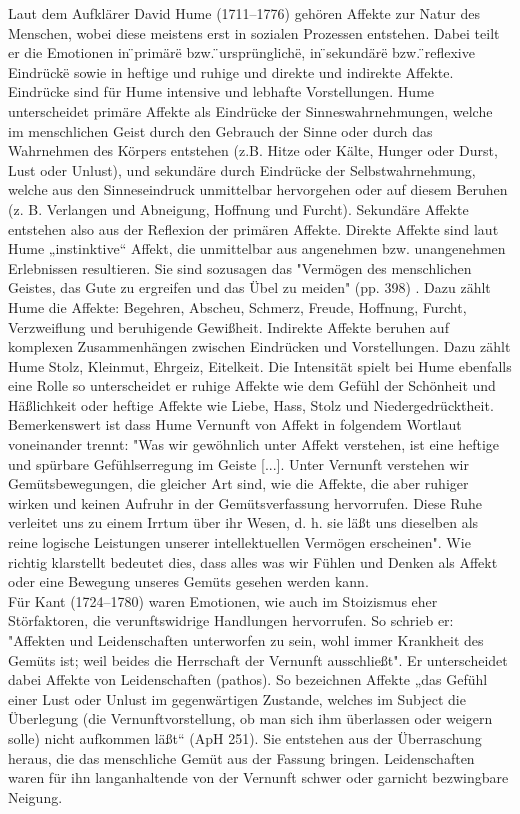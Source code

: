 Laut dem Aufklärer David Hume (1711–1776)  gehören Affekte zur Natur des Menschen, wobei diese meistens erst in sozialen Prozessen entstehen. Dabei teilt er die Emotionen in \"{}primäre\"{} bzw. \"{}ursprüngliche\"{}, in \"{}sekundäre\"{} bzw. \"{}reflexive Eindrücke\"{} sowie in heftige und ruhige und direkte und indirekte Affekte. Eindrücke sind für Hume intensive und lebhafte Vorstellungen. Hume unterscheidet primäre Affekte als Eindrücke der Sinneswahrnehmungen, welche im menschlichen Geist durch den Gebrauch der Sinne oder durch das Wahrnehmen des Körpers entstehen (z.B.  Hitze  oder  Kälte,  
Hunger  oder  Durst,  Lust  oder  Unlust), und sekundäre durch Eindrücke der Selbstwahrnehmung, welche aus den Sinneseindruck unmittelbar hervorgehen oder auf diesem Beruhen (z. B. Verlangen und Abneigung,  Hoffnung und Furcht). Sekundäre Affekte entstehen also aus der Reflexion der primären Affekte. Direkte Affekte sind laut Hume  „instinktive“ Affekt, die unmittelbar aus angenehmen bzw. unangenehmen Erlebnissen resultieren. Sie sind sozusagen das  "Vermögen  des  menschlichen  
Geistes,  das  Gute  zu  ergreifen  und  das  Übel  zu  meiden" (pp. 398) \cite{demmerling_hume:_2008}. Dazu zählt Hume die Affekte: Begehren,  Abscheu,  Schmerz,  Freude,  Hoffnung,  Furcht,  Verzweiflung und beruhigende Gewißheit. Indirekte Affekte beruhen auf komplexen Zusammenhängen zwischen Eindrücken und Vorstellungen. Dazu zählt Hume Stolz,  Kleinmut,  Ehrgeiz,  
Eitelkeit. Die Intensität spielt bei Hume ebenfalls eine Rolle so unterscheidet er ruhige Affekte wie dem Gefühl der Schönheit und Häßlichkeit oder heftige Affekte wie Liebe, Hass, Stolz und Niedergedrücktheit. Bemerkenswert ist dass Hume Vernunft von Affekt in folgendem Wortlaut voneinander trennt: 
"Was  wir  gewöhnlich  unter Affekt verstehen,  ist  eine  heftige  und  spürbare  Gefühlserregung im Geiste [...]. Unter Vernunft verstehen wir Gemütsbewegungen, die gleicher Art sind, wie die Affekte, die aber ruhiger wirken und keinen Aufruhr in der Gemütsverfassung hervorrufen. Diese Ruhe verleitet uns zu einem Irrtum über ihr Wesen, d. h. sie läßt uns dieselben als reine logische Leistungen unserer intellektuellen Vermögen erscheinen".
Wie \cite{demmerling_hume:_2008} richtig klarstellt bedeutet dies, dass alles was wir Fühlen und Denken  als Affekt oder eine Bewegung unseres Gemüts gesehen werden kann. \cite{demmerling_hume:_2008}\\


Für Kant (1724–1780)  waren Emotionen, wie auch im Stoizismus eher Störfaktoren, die verunftswidrige Handlungen hervorrufen. So schrieb er: "Affekten    und    Leidenschaften    
unterworfen zu sein, wohl immer Krankheit des Gemüts ist; weil beides die Herrschaft der Vernunft ausschließt".  Er unterscheidet dabei Affekte von Leidenschaften (pathos). So bezeichnen Affekte „das Gefühl einer Lust oder Unlust  im  gegenwärtigen  Zustande,  welches  im  Subject  die  Überlegung (die  Vernunftvorstellung,  ob  man  sich  ihm  überlassen  oder  weigern  solle)  nicht  aufkommen  läßt“  (ApH  251). Sie entstehen aus der Überraschung heraus, die das menschliche Gemüt aus der Fassung bringen. Leidenschaften waren für ihn langanhaltende von der Vernunft schwer oder garnicht bezwingbare Neigung.\\


